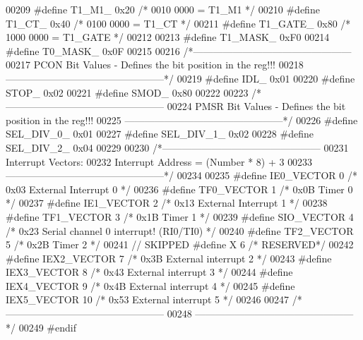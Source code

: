 \begin{DoxyCode}
00209 \textcolor{preprocessor}{#define T1\_M1\_   0x20 }\textcolor{comment}{/* 0010 0000 = T1\_M1 */}\textcolor{preprocessor}{}
00210 \textcolor{preprocessor}{#define T1\_CT\_   0x40 }\textcolor{comment}{/* 0100 0000 = T1\_CT */}\textcolor{preprocessor}{}
00211 \textcolor{preprocessor}{#define T1\_GATE\_ 0x80 }\textcolor{comment}{/* 1000 0000 = T1\_GATE */}\textcolor{preprocessor}{}
00212 
00213 \textcolor{preprocessor}{#define T1\_MASK\_ 0xF0}
00214 \textcolor{preprocessor}{#define T0\_MASK\_ 0x0F}
00215 
00216 \textcolor{comment}{/*------------------------------------------------}
00217 \textcolor{comment}{PCON Bit Values - Defines the bit position in the reg!!!}
00218 \textcolor{comment}{------------------------------------------------*/}
00219 \textcolor{preprocessor}{#define IDL\_    0x01}
00220 \textcolor{preprocessor}{#define STOP\_   0x02}
00221 \textcolor{preprocessor}{#define SMOD\_   0x80}
00222 
00223 \textcolor{comment}{/*------------------------------------------------}
00224 \textcolor{comment}{PMSR Bit Values - Defines the bit position in the reg!!!}
00225 \textcolor{comment}{------------------------------------------------*/}
00226 \textcolor{preprocessor}{#define SEL\_DIV\_0\_ 0x01}
00227 \textcolor{preprocessor}{#define SEL\_DIV\_1\_ 0x02}
00228 \textcolor{preprocessor}{#define SEL\_DIV\_2\_ 0x04}
00229 
00230 \textcolor{comment}{/*------------------------------------------------}
00231 \textcolor{comment}{Interrupt Vectors:}
00232 \textcolor{comment}{Interrupt Address = (Number * 8) + 3 }
00233 \textcolor{comment}{------------------------------------------------*/}
00234 
00235 \textcolor{preprocessor}{#define IE0\_VECTOR      0  }\textcolor{comment}{/* 0x03 External Interrupt 0 */}\textcolor{preprocessor}{}
00236 \textcolor{preprocessor}{#define TF0\_VECTOR      1  }\textcolor{comment}{/* 0x0B Timer 0 */}\textcolor{preprocessor}{}
00237 \textcolor{preprocessor}{#define IE1\_VECTOR      2  }\textcolor{comment}{/* 0x13 External Interrupt 1 */}\textcolor{preprocessor}{}
00238 \textcolor{preprocessor}{#define TF1\_VECTOR      3  }\textcolor{comment}{/* 0x1B Timer 1 */}\textcolor{preprocessor}{}
00239 \textcolor{preprocessor}{#define SIO\_VECTOR  4  }\textcolor{comment}{/* 0x23 Serial channel 0 interrupt! (RI0/TI0) */}\textcolor{preprocessor}{}
00240 \textcolor{preprocessor}{#define TF2\_VECTOR      5  }\textcolor{comment}{/* 0x2B Timer 2 */}\textcolor{preprocessor}{}
00241 \textcolor{comment}{//  SKIPPED #define X   6  /* RESERVED*/}
00242 \textcolor{preprocessor}{#define IEX2\_VECTOR 7    }\textcolor{comment}{/* 0x3B External interrupt 2 */}\textcolor{preprocessor}{}
00243 \textcolor{preprocessor}{#define IEX3\_VECTOR 8    }\textcolor{comment}{/* 0x43 External interrupt 3 */}\textcolor{preprocessor}{}
00244 \textcolor{preprocessor}{#define IEX4\_VECTOR 9    }\textcolor{comment}{/* 0x4B External interrupt 4 */}\textcolor{preprocessor}{}
00245 \textcolor{preprocessor}{#define IEX5\_VECTOR 10   }\textcolor{comment}{/* 0x53 External interrupt 5 */}\textcolor{preprocessor}{}
00246 
00247 \textcolor{comment}{/*------------------------------------------------}
00248 \textcolor{comment}{------------------------------------------------*/}
00249 \textcolor{preprocessor}{#endif}
\end{DoxyCode}
